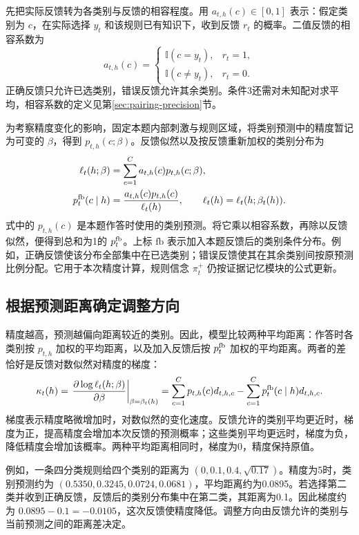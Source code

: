 \documentclass[12pt]{article}
\newcommand{\ind}{\mathbb I}
\begin{document}
先把实际反馈转为各类别与反馈的相容程度。用 $a_{t,h}(c)\in[0,1]$ 表示：假定类别为 $c$，在实际选择 $y_t$ 和该规则已有知识下，收到反馈 $r_t$ 的概率。二值反馈的相容系数为
\begin{equation}
a_{t,h}(c)=
\begin{cases}
\ind(c=y_t),&r_t=1,\\
\ind(c\ne y_t),&r_t=0.
\end{cases}
\label{eq:binary-feedback-compatibility}
\end{equation}
正确反馈只允许已选类别，错误反馈允许其余类别。条件3还需对未知配对求平均，相容系数的定义见第\ref{sec:pairing-precision}节。

为考察精度变化的影响，固定本题内部刺激与规则区域，将类别预测中的精度暂记为可变的 $\beta$，得到 $p_{t,h}(c;\beta)$。反馈似然以及按反馈重新加权的类别分布为
\begin{align}
\ell_t(h;\beta)&=\sum_{c=1}^{C}a_{t,h}(c)p_{t,h}(c;\beta),
\label{eq:precision-feedback-likelihood}\\
p_t^{\rm fb}(c\mid h)&=
\frac{a_{t,h}(c)p_{t,h}(c)}{\ell_t(h)},
\qquad \ell_t(h)=\ell_t(h;\beta_t(h)).
\label{eq:feedback-category-distribution}
\end{align}
式中的 $p_{t,h}(c)$ 是本题作答时使用的类别预测。将它乘以相容系数，再除以反馈似然，便得到总和为1的 $p_t^{\rm fb}$。上标 $\mathrm{fb}$ 表示加入本题反馈后的类别条件分布。例如，正确反馈使该分布全部集中在已选类别；错误反馈使其在其余类别间按原预测比例分配。它用于本次精度计算，规则信念 $\pi_t^+$ 仍按证据记忆模块的公式更新。

\subsection{根据预测距离确定调整方向}

精度越高，预测越偏向距离较近的类别。因此，模型比较两种平均距离：作答时各类别按 $p_{t,h}$ 加权的平均距离，以及加入反馈后按 $p_t^{\rm fb}$ 加权的平均距离。两者的差恰好是反馈对数似然对精度的梯度：
\begin{equation}
\kappa_t(h)=
\left.\frac{\partial\log\ell_t(h;\beta)}{\partial\beta}\right|_{\beta=\beta_t(h)}
=\sum_{c=1}^{C}p_{t,h}(c)d_{t,h,c}
-\sum_{c=1}^{C}p_t^{\rm fb}(c\mid h)d_{t,h,c}.
\label{eq:precision-gradient}
\end{equation}
梯度表示精度略微增加时，对数似然的变化速度。反馈允许的类别平均更近时，梯度为正，提高精度会增加本次反馈的预测概率；这些类别平均更远时，梯度为负，降低精度会增加该概率。两种平均距离相同时，梯度为0，精度保持原值。

例如，一条四分类规则给四个类别的距离为 $(0,0.1,0.4,\sqrt{0.17})$。精度为5时，类别预测约为 $(0.5350,0.3245,0.0724,0.0681)$，平均距离约为0.0895。若选择第二类并收到正确反馈，反馈后的类别分布集中在第二类，其距离为0.1。因此梯度约为 $0.0895-0.1=-0.0105$，这次反馈使精度降低。调整方向由反馈允许的类别与当前预测之间的距离差决定。
\end{document}
